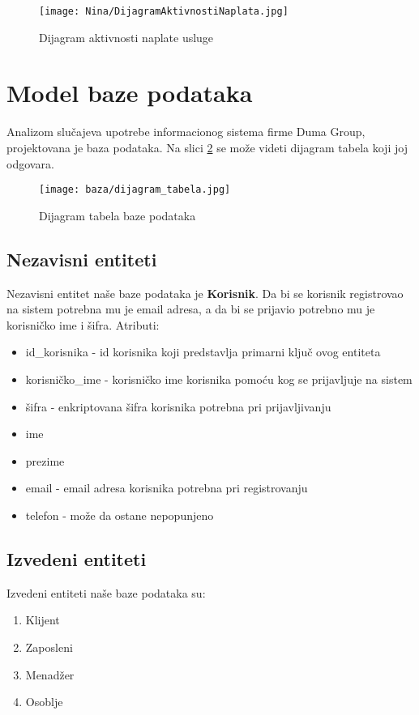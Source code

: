 \documentclass[a4paper]{article}
\begin{document}
\begin{figure}[H]
    \centering
    \texttt{[image: Nina/DijagramAktivnostiNaplata.jpg]}
    \caption{Dijagram aktivnosti naplate usluge}
    \label{fig:RegistracijaZ}
\end{figure}

\section{Model baze podataka}

Analizom slučajeva upotrebe informacionog sistema firme Duma Group, projektovana je baza podataka. Na slici \ref{fig:dijagramTabela}  se može videti dijagram tabela koji joj odgovara.

\begin{figure}[H]
    \centering
    \texttt{[image: baza/dijagram\_tabela.jpg]}
    \caption{Dijagram tabela baze podataka}
    \label{fig:dijagramTabela}
\end{figure}

\subsection{Nezavisni entiteti}

Nezavisni entitet naše baze podataka je \textbf{Korisnik}. Da bi se korisnik registrovao na sistem potrebna mu je email adresa, a da bi se prijavio potrebno mu je korisničko ime i šifra. Atributi:
\begin{itemize}
    \item id\_korisnika - id korisnika koji predstavlja primarni ključ ovog entiteta
    \item korisničko\_ime - korisničko ime korisnika pomoću kog se prijavljuje na sistem
    \item šifra - enkriptovana šifra korisnika potrebna pri prijavljivanju
    \item ime
    \item prezime
    \item email - email adresa korisnika potrebna pri registrovanju
    \item telefon - može da ostane nepopunjeno
\end{itemize}


\subsection{Izvedeni entiteti}

Izvedeni entiteti naše baze podataka su:
\begin{enumerate}
    \item Klijent
    \item Zaposleni
    \item Menadžer
    \item Osoblje
\end{enumerate}
\end{document}
